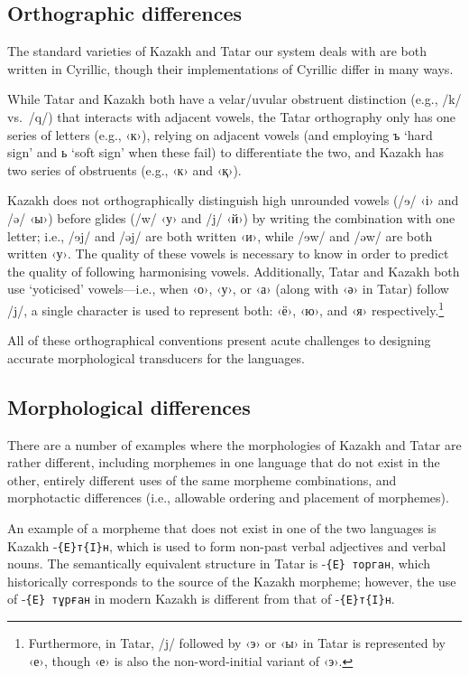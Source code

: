 \documentclass[11pt]{article}
\begin{document}
\subsection{Orthographic differences}
The standard varieties of Kazakh and Tatar our system deals with are both written in Cyrillic, though their 
implementations of Cyrillic differ in many ways.

While Tatar and Kazakh both have a velar/uvular obstruent distinction (e.g., /k/ vs.\ /q/) that interacts with 
adjacent vowels, the Tatar orthography only has one series of letters (e.g., ‹к›), relying on adjacent 
vowels (and employing ъ `hard sign' and ь `soft sign' when these fail) to differentiate the two, and Kazakh 
has two series of obstruents (e.g., ‹к› and ‹қ›).

Kazakh does not orthographically distinguish high unrounded vowels (/{\qipa ɘ}/ ‹і› and /ə/ ‹ы›) before 
glides (/w/ ‹у› and /j/ ‹й›) by writing the combination with one letter; i.e., /{\qipa ɘ}j/ and /əj/ are both 
written ‹и›, while /{\qipa ɘ}w/ and /əw/ are both written ‹у›.  The quality of these vowels is necessary to know in 
order to predict the quality of following harmonising vowels. %
Additionally, Tatar and Kazakh both use `yoticised' vowels---i.e., when ‹о›, ‹у›, or ‹а› (along with ‹ә› in 
Tatar) follow /j/, a single character is used to represent both: ‹ё›, ‹ю›, and ‹я› respectively.\footnote{Furthermore, in Tatar, /j/ followed by ‹э› or ‹ы› in Tatar is represented by ‹е›, though ‹е› is also the non-word-initial variant of ‹э›.}  %

All of these orthographical conventions present acute challenges to designing accurate morphological transducers for the languages.

\subsection{Morphological differences}
There are a number of examples where the morphologies of Kazakh and Tatar are rather different, including 
morphemes in one language that do not exist in the other, entirely different uses of the same morpheme 
combinations, and morphotactic differences (i.e., allowable ordering and placement of morphemes).

An example of a morpheme that does not exist in one of the two languages is Kazakh -\texttt{\{E\}т\{I\}н}, 
which is used to form non-past verbal adjectives and verbal nouns.  The semantically equivalent structure 
in Tatar is -\texttt{\{E\} торган}, which historically corresponds to the source of the Kazakh morpheme; 
however, the use of -\texttt{\{E\} тұрған} in modern Kazakh is different from that of -\texttt{\{E\}т\{I\}н}.
\end{document}

